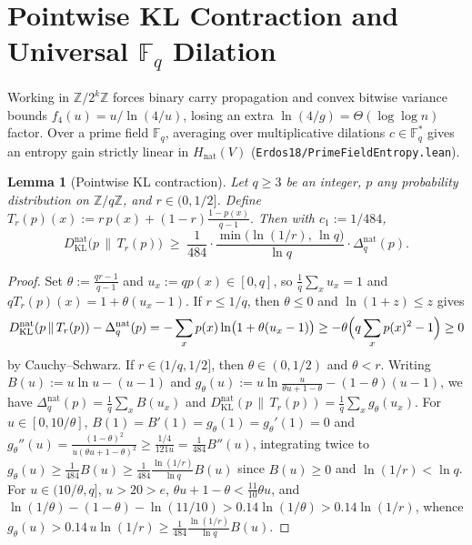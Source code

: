 \documentclass[11pt,a4paper]{amsart}
\newtheorem{lemma}[theorem]{Lemma}
\theoremstyle{definition}
\theoremstyle{remark}
\newcommand{\Z}{\mathbb{Z}}
\newcommand{\F}{\mathbb{F}}
\begin{document}
\section{Pointwise KL Contraction and Universal $\F_q$ Dilation}\label{sec:entropy}

Working in $\Z/2^k\Z$ forces binary carry propagation and convex bitwise variance bounds $f_4(u) = u/\ln(4/u)$, losing an extra $\ln(4/g) = \Theta(\log\log n)$ factor. Over a prime field $\F_q$, averaging over multiplicative dilations $c \in \F_q^*$ gives an entropy gain strictly linear in $H_{\mathrm{nat}}(V)$ (\texttt{Erdos18/PrimeFieldEntropy.lean}).

\begin{lemma}[Pointwise KL contraction]\label{lem:kl}
Let $q \ge 3$ be an integer, $p$ any probability distribution on $\Z/q\Z$, and $r \in (0, 1/2]$. Define $T_r(p)(x) := r\,p(x) + (1-r)\frac{1-p(x)}{q-1}$. Then with $c_1 := 1/484$,
\[
  D_{\mathrm{KL}}^{\mathrm{nat}}\bigl(p \,\|\, T_r(p)\bigr)
  \;\ge\; \frac{1}{484} \cdot \frac{\min\bigl(\ln(1/r),\, \ln q\bigr)}{\ln q} \cdot \Delta_q^{\mathrm{nat}}(p).
\]
\end{lemma}

\begin{proof}
Set $\theta := \frac{qr - 1}{q - 1}$ and $u_x := q p(x) \in [0,q]$, so $\frac{1}{q}\sum_x u_x = 1$ and $q T_r(p)(x) = 1 + \theta(u_x - 1)$.
If $r \le 1/q$, then $\theta \le 0$ and $\ln(1+z) \le z$ gives
\[
  D_{\mathrm{KL}}^{\mathrm{nat}}(p \,\|\, T_r(p)) - \Delta_q^{\mathrm{nat}}(p)
  = -\sum_x p(x)\ln\bigl(1 + \theta(u_x - 1)\bigr)
  \ge -\theta\Bigl(q\sum_x p(x)^2 - 1\Bigr) \ge 0
\]
by Cauchy--Schwarz. If $r \in (1/q, 1/2]$, then $\theta \in (0, 1/2)$ and $\theta < r$. Writing $B(u) := u\ln u - (u-1)$ and $g_\theta(u) := u\ln\frac{u}{\theta u + 1 - \theta} - (1-\theta)(u-1)$, we have $\Delta_q^{\mathrm{nat}}(p) = \frac{1}{q}\sum_x B(u_x)$ and $D_{\mathrm{KL}}^{\mathrm{nat}}(p \,\|\, T_r(p)) = \frac{1}{q}\sum_x g_\theta(u_x)$. For $u \in [0, 10/\theta]$, $B(1)=B'(1)=g_\theta(1)=g_\theta'(1)=0$ and $g_\theta''(u) = \frac{(1-\theta)^2}{u(\theta u + 1 - \theta)^2} \ge \frac{1/4}{121 u} = \frac{1}{484} B''(u)$, integrating twice to $g_\theta(u) \ge \frac{1}{484} B(u) \ge \frac{1}{484}\frac{\ln(1/r)}{\ln q} B(u)$ since $B(u) \ge 0$ and $\ln(1/r) < \ln q$. For $u \in (10/\theta, q]$, $u > 20 > e$, $\theta u + 1 - \theta < \frac{11}{10}\theta u$, and $\ln(1/\theta) - (1-\theta) - \ln(11/10) > 0.14\ln(1/\theta) > 0.14\ln(1/r)$, whence $g_\theta(u) > 0.14\,u\ln(1/r) \ge \frac{1}{484}\frac{\ln(1/r)}{\ln q} B(u)$.
\end{proof}
\end{document}
